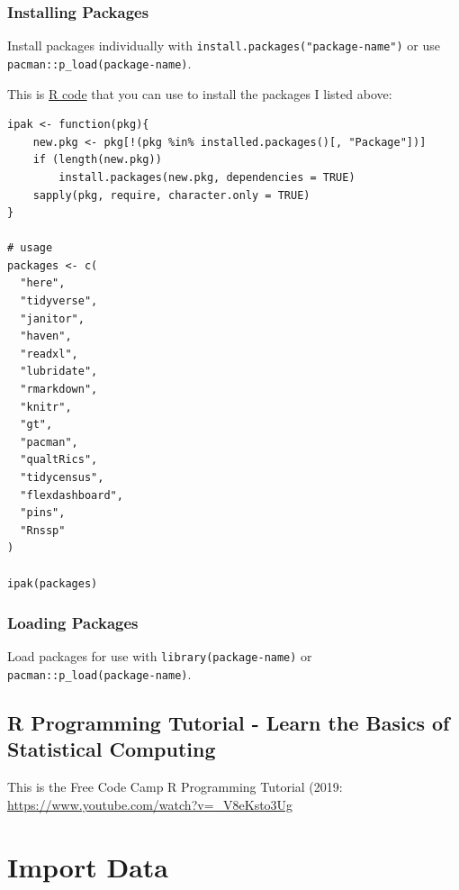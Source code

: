 \documentclass[
  letterpaper,
  DIV=11,
  numbers=noendperiod]{scrreprt}
\begin{document}
\hypertarget{installing-packages}{%
\subsection{Installing Packages}\label{installing-packages}}

Install packages individually with
\texttt{install.packages("package-name")} or use
\texttt{pacman::p\_load(package-name)}.

This is \href{https://gist.github.com/stevenworthington/3178163}{R code}
that you can use to install the packages I listed above:

\begin{verbatim}
ipak <- function(pkg){
    new.pkg <- pkg[!(pkg %in% installed.packages()[, "Package"])]
    if (length(new.pkg)) 
        install.packages(new.pkg, dependencies = TRUE)
    sapply(pkg, require, character.only = TRUE)
}

# usage
packages <- c(
  "here",
  "tidyverse",
  "janitor",
  "haven",
  "readxl",
  "lubridate",
  "rmarkdown",
  "knitr",
  "gt",
  "pacman",
  "qualtRics",
  "tidycensus",
  "flexdashboard",
  "pins",
  "Rnssp"
)

ipak(packages)
\end{verbatim}

\hypertarget{loading-packages}{%
\subsection{Loading Packages}\label{loading-packages}}

Load packages for use with \texttt{library(package-name)} or
\texttt{pacman::p\_load(package-name)}.

\hypertarget{r-programming-tutorial---learn-the-basics-of-statistical-computing}{%
\section{R Programming Tutorial - Learn the Basics of Statistical
Computing}\label{r-programming-tutorial---learn-the-basics-of-statistical-computing}}

This is the Free Code Camp R Programming Tutorial (2019:
\url{https://www.youtube.com/watch?v=_V8eKsto3Ug}


\hypertarget{import-data}{%
\chapter{Import Data}\label{import-data}}
\end{document}
